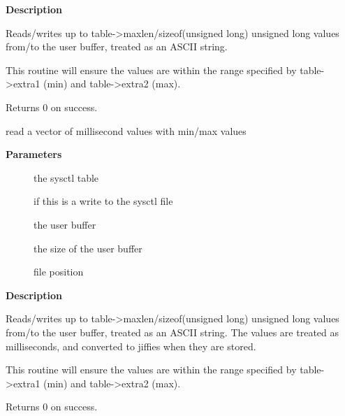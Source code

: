 \documentclass[a4paper,8pt,english]{sphinxmanual}
\begin{document}
\textbf{Description}

Reads/writes up to table-\textgreater{}maxlen/sizeof(unsigned long) unsigned long
values from/to the user buffer, treated as an ASCII string.

This routine will ensure the values are within the range specified by
table-\textgreater{}extra1 (min) and table-\textgreater{}extra2 (max).

Returns 0 on success.

\begin{fulllineitems}
\label{filesystems/index:c.proc_doulongvec_ms_jiffies_minmax}
read a vector of millisecond values with min/max values

\end{fulllineitems}


\textbf{Parameters}
\begin{description}
\item[{}] \leavevmode
the sysctl table

\item[{}] \leavevmode
{} if this is a write to the sysctl file

\item[{}] \leavevmode
the user buffer

\item[{}] \leavevmode
the size of the user buffer

\item[{}] \leavevmode
file position

\end{description}

\textbf{Description}

Reads/writes up to table-\textgreater{}maxlen/sizeof(unsigned long) unsigned long
values from/to the user buffer, treated as an ASCII string. The values
are treated as milliseconds, and converted to jiffies when they are stored.

This routine will ensure the values are within the range specified by
table-\textgreater{}extra1 (min) and table-\textgreater{}extra2 (max).

Returns 0 on success.
\end{document}
